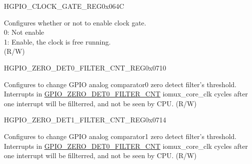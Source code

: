 \begin{register}{H}{GPIO\_CLOCK\_GATE\_REG}{0x064C}\label{regdesc:GPIOCLOCKGATEREG}
%
%
\regnewline%
\begin{regdesc}\begin{reglist}
\label{fielddesc:GPIOCLKEN}\item [GPIO\_CLK\_EN] Configures whether or not to enable clock gate.\\
0: Not enable\\
1: Enable, the clock is free running. \\
(R/W)
\end{reglist}\end{regdesc}
\end{register}

\begin{register}{H}{GPIO\_ZERO\_DET0\_FILTER\_CNT\_REG}{0x0710}\label{regdesc:GPIOZERODET0FILTERCNTREG}
%
\regnewline%
\begin{regdesc}\begin{reglist}
\label{fielddesc:GPIOZERODET0FILTERCNT}\item [GPIO\_ZERO\_DET0\_FILTER\_CNT] Configures to change GPIO analog comparator0 zero detect filter's threshold. \\Interrupts in \hyperref[fielddesc:GPIOZERODET0FILTERCNT]{GPIO\_ZERO\_DET0\_FILTER\_CNT} iomux\_core\_clk cycles after one interrupt will be fillterred, and not be seen by CPU. (R/W)
\end{reglist}\end{regdesc}
\end{register}


\begin{register}{H}{GPIO\_ZERO\_DET1\_FILTER\_CNT\_REG}{0x0714}\label{regdesc:GPIOZERODET1FILTERCNTREG}
%
\regnewline%
\begin{regdesc}\begin{reglist}
\label{fielddesc:GPIOZERODET1FILTERCNT}\item [GPIO\_ZERO\_DET1\_FILTER\_CNT] Configures to change GPIO analog comparator1 zero detect filter's threshold.\\ Interrupts in \hyperref[fielddesc:GPIOZERODET0FILTERCNT]{GPIO\_ZERO\_DET0\_FILTER\_CNT} iomux\_core\_clk cycles after one interrupt will be fillterred, and not be seen by CPU. (R/W)
\end{reglist}\end{regdesc}
\end{register}

